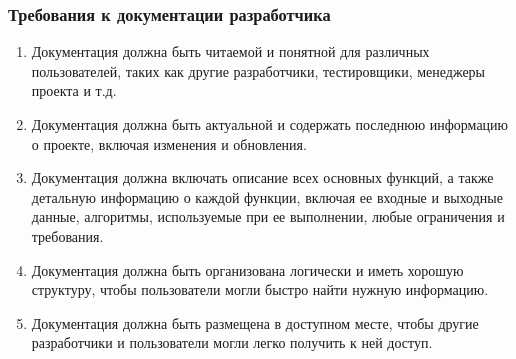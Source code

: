 \documentclass[14pt, a4paper]{extarticle}
\begin{document}
\subsubsection*{Требования к документации разработчика}

\begin{enumerate}
\item Документация должна быть читаемой и понятной для различных пользователей, таких как другие разработчики, тестировщики, менеджеры проекта и т.д.
\item Документация должна быть актуальной и содержать последнюю информацию о проекте, включая изменения и обновления.
\item Документация должна включать описание всех основных функций, а также детальную информацию о каждой функции, включая ее входные и выходные данные, алгоритмы, используемые при ее выполнении, любые ограничения и требования.
\item Документация должна быть организована логически и иметь хорошую структуру, чтобы пользователи могли быстро найти нужную информацию.
\item Документация должна быть размещена в доступном месте, чтобы другие разработчики и пользователи могли легко получить к ней доступ.
\end{enumerate}
\end{document}
